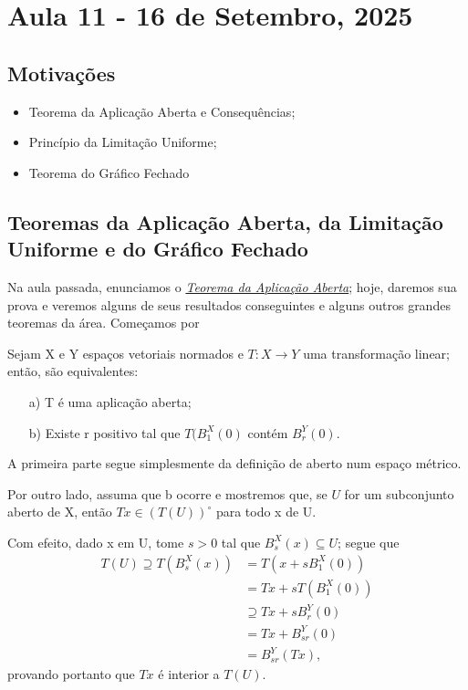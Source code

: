 \documentclass[../functional_analysis.tex]{subfiles}
\begin{document}
\section{Aula 11 - 16 de Setembro, 2025}
\subsection{Motivações}
\begin{itemize}
	\item Teorema da Aplicação Aberta e Consequências;
	\item Princípio da Limitação Uniforme;
	\item Teorema do Gráfico Fechado
\end{itemize}
\subsection{Teoremas da Aplicação Aberta, da Limitação Uniforme e do Gráfico Fechado}
Na aula passada, enunciamos o \hyperlink{open_application}{\textit{Teorema da Aplicação Aberta}}; hoje, daremos sua prova e veremos alguns de seus resultados conseguintes e alguns outros grandes teoremas da área. Começamos por
\begin{lemma*}
	Sejam X e Y espaços vetoriais normados e \(T:X\rightarrow Y\) uma transformação linear; então, são equivalentes:
	\begin{itemize}
		\item[a)] T é uma aplicação aberta;
		\item[b)] Existe r positivo tal que \(T(B_{1}^{X}(0)\) contém \(B_{r}^{Y}(0)\).
	\end{itemize}
\end{lemma*}
\begin{proof*}
	A primeira parte segue simplesmente da definição de aberto num espaço métrico.

	Por outro lado, assuma que b ocorre e mostremos que, se \(U\) for um subconjunto aberto de X, então \(Tx\in (T(U))^{\circ }\) para todo x de U.

	Com efeito, dado x em U, tome \(s> 0\) tal que \(B_{s}^{X}(x)\subseteq U\); segue que
	\begin{align*}
		T(U)\supseteq T(B_{s}^{X}(x)) & = T(x + sB_{1}^{X}(0))       \\
		                              & = Tx + sT(B_{1}^{X}(0))      \\
		                              & \supseteq Tx + sB_{r}^{Y}(0) \\
		                              & = Tx + B_{sr}^{Y}(0)         \\
		                              & = B_{sr}^{Y}(Tx),
	\end{align*}
	provando portanto que \(Tx\) é interior a \(T(U)\). \qedsymbol
\end{proof*}
\end{document}
